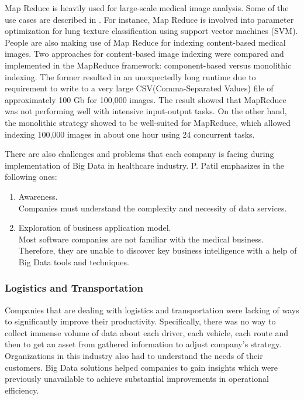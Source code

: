 \documentclass[runningheads]{llncs}
\begin{document}
Map Reduce is heavily used for large-scale medical image analysis. Some of the use cases are described in \cite{HEALTHARTICLE}. For instance, Map Reduce is involved into parameter optimization for lung texture classification using support vector machines (SVM). People are also making use of Map Reduce for indexing content-based medical images. Two approaches for content-based image indexing were compared
and implemented in the MapReduce framework: component-based versus monolithic indexing. The former resulted in an unexpectedly long runtime due to requirement to write to a very large CSV(Comma-Separated Values) file of approximately 100 Gb for 100,000 images. The result showed that MapReduce was not performing well with intensive input-output tasks. On the other hand, the monolithic strategy showed to be well-suited for MapReduce, which allowed indexing 100,000 images in about one hour using 24 concurrent tasks. 

There are also challenges and problems that each company is facing during implementation of Big Data in healthcare industry. P. Patil emphasizes in \cite{HEALTHARTICLE} the following ones:

\begin{enumerate}
\item Awareness.\\ 

Companies must understand the complexity and necessity of data services.\\
\item Exploration of business application model.\\

Most software companies are not familiar with the medical business. Therefore, they are unable to discover key business intelligence with a help of Big Data tools and techniques.
\end{enumerate}

\subsubsection{Logistics and Transportation}

Companies that are dealing with logistics and transportation were lacking of ways to significantly improve their productivity. Specifically, there was no way to collect immense volume of data about each driver, each vehicle, each route and then to get an asset from gathered information to adjust company's strategy. Organizations in this industry also had to understand the needs of their customers. Big Data solutions helped companies to gain insights which were previously unavailable to achieve substantial improvements in operational efficiency.
\end{document}
